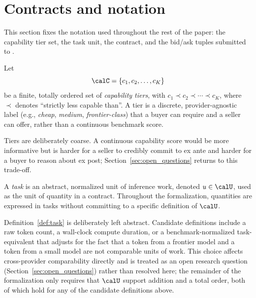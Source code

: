 \section{Contracts and notation}
\label{sec:contracts_and_notation}

This section fixes the notation used throughout the rest of the paper: the
capability tier set, the task unit, the contract, and the bid/ask tuples
submitted to \NoesisMarket.

\begin{definition}
\label{def:capability_tiers}
Let
$$
  \calC = \{ c_1, c_2, \ldots, c_K \}
$$
be a finite, totally ordered set of \emph{capability tiers}, with
$c_1 \prec c_2 \prec \cdots \prec c_K$, where $\prec$ denotes ``strictly
less capable than''. A tier is a discrete, provider-agnostic label (e.g.,
\emph{cheap}, \emph{medium}, \emph{frontier-class}) that a buyer can
require and a seller can offer, rather than a continuous benchmark score.
\end{definition}

Tiers are deliberately coarse. A continuous capability score would be more
informative but is harder for a seller to credibly commit to ex ante and
harder for a buyer to reason about ex post; Section~\ref{sec:open_questions}
returns to this trade-off.

\begin{definition}
\label{def:task}
A \emph{task} is an abstract, normalized unit of inference work, denoted
$u \in \calU$, used as the unit of quantity in a contract. Throughout the
formalization, quantities are expressed in tasks without committing to a
specific definition of $\calU$.
\end{definition}

Definition~\ref{def:task} is deliberately left abstract. Candidate
definitions include a raw token count, a wall-clock compute duration, or a
benchmark-normalized task-equivalent that adjusts for the fact that a
token from a frontier model and a token from a small model are not
comparable units of work. This choice affects cross-provider
comparability directly and is treated as an open research question
(Section~\ref{sec:open_questions}) rather than resolved here; the
remainder of the formalization only requires that $\calU$ support addition
and a total order, both of which hold for any of the candidate
definitions above.


